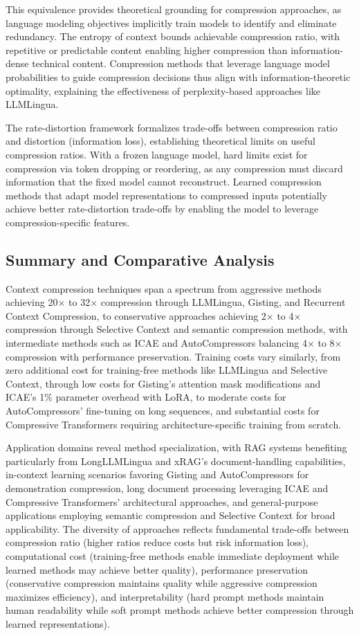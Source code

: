 This equivalence provides theoretical grounding for compression approaches, as language modeling objectives implicitly train models to identify and eliminate redundancy. The entropy of context bounds achievable compression ratio, with repetitive or predictable content enabling higher compression than information-dense technical content. Compression methods that leverage language model probabilities to guide compression decisions thus align with information-theoretic optimality, explaining the effectiveness of perplexity-based approaches like LLMLingua.

The rate-distortion framework formalizes trade-offs between compression ratio and distortion (information loss), establishing theoretical limits on useful compression ratios. With a frozen language model, hard limits exist for compression via token dropping or reordering, as any compression must discard information that the fixed model cannot reconstruct. Learned compression methods that adapt model representations to compressed inputs potentially achieve better rate-distortion trade-offs by enabling the model to leverage compression-specific features.

\subsection{Summary and Comparative Analysis}

Context compression techniques span a spectrum from aggressive methods achieving 20$\times$ to 32$\times$ compression through LLMLingua, Gisting, and Recurrent Context Compression, to conservative approaches achieving 2$\times$ to 4$\times$ compression through Selective Context and semantic compression methods, with intermediate methods such as ICAE and AutoCompressors balancing 4$\times$ to 8$\times$ compression with performance preservation. Training costs vary similarly, from zero additional cost for training-free methods like LLMLingua and Selective Context, through low costs for Gisting's attention mask modifications and ICAE's 1\% parameter overhead with LoRA, to moderate costs for AutoCompressors' fine-tuning on long sequences, and substantial costs for Compressive Transformers requiring architecture-specific training from scratch.

Application domains reveal method specialization, with RAG systems benefiting particularly from LongLLMLingua and xRAG's document-handling capabilities, in-context learning scenarios favoring Gisting and AutoCompressors for demonstration compression, long document processing leveraging ICAE and Compressive Transformers' architectural approaches, and general-purpose applications employing semantic compression and Selective Context for broad applicability. The diversity of approaches reflects fundamental trade-offs between compression ratio (higher ratios reduce costs but risk information loss), computational cost (training-free methods enable immediate deployment while learned methods may achieve better quality), performance preservation (conservative compression maintains quality while aggressive compression maximizes efficiency), and interpretability (hard prompt methods maintain human readability while soft prompt methods achieve better compression through learned representations).

